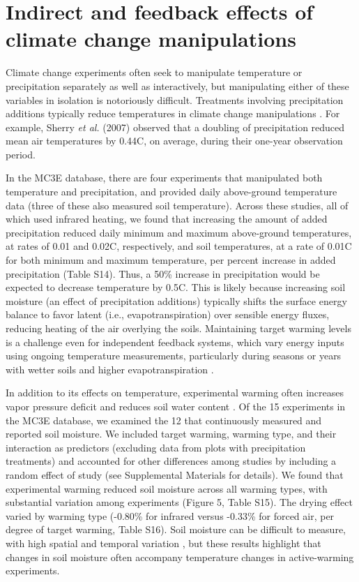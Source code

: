 \documentclass{article}
\begin{document}
\section* {Indirect and feedback effects of climate change manipulations} 
Climate change experiments often seek to manipulate temperature or precipitation separately as well as interactively, but manipulating either of these variables in isolation is notoriously difficult. Treatments involving precipitation additions typically reduce temperatures in climate change manipulations \citep{sherry2007,rollinson2012,mcdaniel2014}. For example, Sherry \emph{et al.} (2007) observed that a doubling of precipitation reduced mean air temperatures by 0.44\degree C, on average, during their one-year observation period. 
\par In the MC3E database, there are four experiments that manipulated both temperature and precipitation, and provided daily above-ground temperature data (three of these also measured soil temperature). Across these studies, all of which used infrared heating, we found that increasing the amount of added precipitation reduced daily minimum and maximum above-ground temperatures, at rates of 0.01 and 0.02\degree C, respectively, and soil temperatures, at a rate of 0.01\degree C for both minimum and maximum temperature, per percent increase in added precipitation (Table S14). Thus, a 50\% increase in precipitation would be expected to decrease temperature by 0.5\degree C.
This is likely because increasing soil moisture (an effect of precipitation additions) typically shifts the surface energy balance to favor latent (i.e., evapotranspiration) over sensible energy fluxes, reducing heating of the air overlying the soils. Maintaining target warming levels is a challenge even for independent feedback systems, which vary energy inputs using ongoing temperature measurements, particularly during seasons or years with wetter soils and higher evapotranspiration \citep{rich2015}.
\par In addition to its effects on temperature, experimental warming often increases vapor pressure deficit and reduces soil water content \citep[e.g.,][]{harte1995b,sherry2007,morin2010,pelini2014,templer2016}. Of the 15 experiments in the MC3E database, we examined the 12 that continuously measured and reported soil moisture. We included target warming, warming type, and their interaction as predictors (excluding data from plots with precipitation treatments) and accounted for other  differences among studies by including a random effect of study (see Supplemental Materials for details). We found that experimental warming reduced soil moisture across all warming types, with substantial variation among experiments (Figure 5, Table S15). The drying effect varied by warming type (-0.80\% for infrared versus -0.33\% for forced air, per degree of target warming, Table S16). Soil moisture can be difficult to measure, with high spatial and temporal variation \citep{famiglietti1999,teuling2005}, but these results highlight that changes in soil moisture often accompany temperature changes in active-warming experiments.
\end{document}
